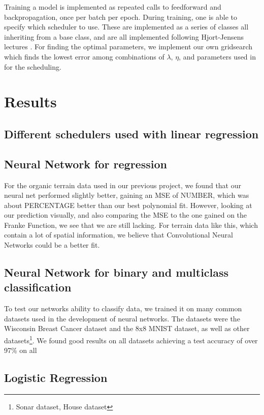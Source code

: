 \documentclass[onecolumn,10pt,cleanfoot]{asme2ej}
\begin{document}
Training a model is implemented as repeated calls to feedforward and backpropagation, once per batch per epoch. During training, one is able to specify which scheduler to use. These are implemented as a series of classes all inheriting from a base class, and are all implemented following Hjort-Jensens lectures \cite{mortensched}. For finding the optimal parameters, we implement our own gridsearch which finds the lowest error among combinations of $\lambda$, $\eta$, and parameters used in for the scheduling.

\section{Results}

\subsection{Different schedulers used with linear regression}

\subsection{Neural Network for regression}

For the organic terrain data used in our previous project, we found that our neural net performed slightly better, gaining an MSE of NUMBER, which was about PERCENTAGE better than our best polynomial fit. However, looking at our prediction visually, and also comparing the MSE to the one gained on the Franke Function, we see that we are still lacking. For terrain data like this, which contain a lot of spatial information, we believe that Convolutional Neural Networks could be a better fit.

\subsection{Neural Network for binary and multiclass classification}

To test our networks ability to classify data, we trained it on many common datasets used in the development of neural networks. The datasets were the Wisconsin Breast Cancer dataset and the 8x8 MNIST dataset, as well as other datasets\footnote{Sonar dataset, House dataset}. We found good results on all datasets achieving a test accuracy of over 97\% on all 

\subsection{Logistic Regression}
\end{document}
